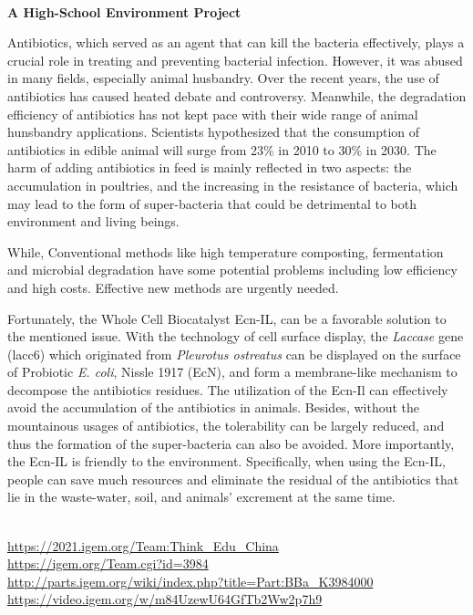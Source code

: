 \textbf{\\A High-School Environment Project\\}\begin{spacing}{1.5}

Antibiotics, which served as an agent that can kill the bacteria effectively, plays a crucial role in treating and preventing bacterial infection. However, it was abused in many fields, especially animal husbandry. Over the recent years, the use of antibiotics has caused heated debate and controversy. Meanwhile, the degradation efficiency of antibiotics has not kept pace with their wide range of animal hunsbandry applications. Scientists hypothesized that the consumption of antibiotics in edible animal will surge from 23\% in 2010 to 30\% in 2030. The harm of adding antibiotics in feed is mainly reflected in two aspects: the accumulation in poultries, and the increasing in the resistance of bacteria, which may lead to the form of super-bacteria that could be detrimental to both environment and living beings.

While, Conventional methods like high temperature composting, fermentation and microbial degradation have some potential problems including low efficiency and high costs. Effective new methods are urgently needed.

Fortunately, the Whole Cell Biocatalyst Ecn-IL, can be a favorable solution to the mentioned issue. With the technology of cell surface display, the \textit{Laccase} gene (lacc6) which originated from \textit{Pleurotus ostreatus} can be displayed on the surface of Probiotic \textit{E. coli}, Nissle 1917 (EcN), and form a membrane-like mechanism to decompose the antibiotics residues. The utilization of the Ecn-Il can effectively avoid the accumulation of the antibiotics in animals. Besides, without the mountainous usages of antibiotics, the tolerability can be largely reduced, and thus the formation of the super-bacteria can also be avoided. More importantly, the Ecn-IL is friendly to the environment. Specifically, when using the Ecn-IL, people can save much resources and eliminate the residual of the antibiotics that lie in the waste-water, soil, and animals' excrement at the same time.\end{spacing}
\\

\url{https://2021.igem.org/Team:Think\_Edu\_China }\\
\url{https://igem.org/Team.cgi?id=3984 }\\
\url{http://parts.igem.org/wiki/index.php?title=Part:BBa_K3984000 }\\
\url{https://video.igem.org/w/m84UzewU64GfTb2Ww2p7h9 }\\

